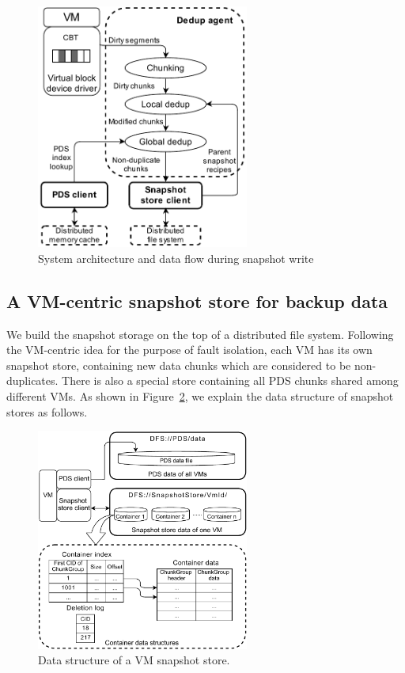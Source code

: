 \begin{figure}[htbp]
    \centering
    \includegraphics[width=2.75in]{images/socc_arch_cluster}
    \caption{System architecture and data flow during snapshot write}
    \label{fig:arch_vm}
\end{figure}

\subsection{A VM-centric snapshot store for backup data}
\label{sect:store}
We build the snapshot storage on the top of a distributed file system.
Following the VM-centric idea for the purpose of fault isolation,
each VM has its own snapshot store, containing new data chunks which are considered
to be non-duplicates.
There is also a special store containing all PDS chunks shared among different VMs.
As shown in Figure~\ref{fig:as_arch}, we explain the data structure of snapshot stores as follows.
\begin{figure}[htbp]
  \centering
  \includegraphics[width=2.75in]{images/sstore_arch}
  \caption{Data structure of a VM snapshot store.}
  \label{fig:as_arch}
\end{figure}

